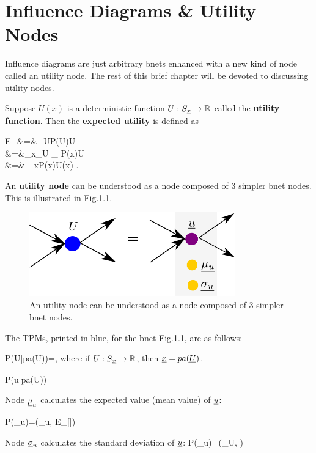\chapter{Influence Diagrams \& Utility Nodes}
\label{ch-inf-dia}

Influence diagrams are
just arbitrary bnets
enhanced with a 
new kind of node called an utility node.
The rest
of this brief chapter  will 
be devoted to discussing utility nodes.

Suppose $U(x)$ is a deterministic 
function $U:S_{\underline{x}}\rightarrow { \mathbb{R}}$
called the {\bf utility function}.
Then the {\bf expected utility}
is defined as


\beqa
E_\rvU[\rvU]&=&\sum_UP(U)U
\\
&=&\sum_x\sum_U
_
{\delta[U, U(x)]}P(x)U
\\
&=&
\sum_xP(x)U(x)
\;.
\eeqa

An {\bf utility node}
can be
understood
as a node
composed of 3 simpler bnet nodes.
This
is illustrated in Fig.\ref{fig-util-node}.

\begin{figure}[h!]
\centering
\includegraphics[width=3.5in]
{inf-dia/util-node.png}
\caption{An utility node
can be
understood
as a node 
composed of 3 simpler bnet nodes.} 
\label{fig-util-node}
\end{figure}

The TPMs,
printed in blue,
for the bnet Fig.\ref{fig-util-node},
are as follows:

\beq\color{blue}
P(U|pa(U))=\delta[U, U(pa(U))]
\;,
\eeq
where if $U:S_{\underline{x}}\rightarrow { \mathbb{R}}$,
then ${\underline{x}}=pa({\underline{U}})$.

\beq\color{blue}
P(u|pa(U))=
\delta[u, U(pa(U))]
\eeq

Node $\underline{\mu}_u$
calculates the
expected value (mean value) of ${\underline{u}}$:

\beq\color{blue}
P(\mu_u)=\delta(\mu_u,
E_{\rvu}[\rvu])
\eeq

Node $\underline{\sigma}_u$
calculates the
standard deviation of ${\underline{u}}$:
\beq\color{blue}
P(\sigma_u)=\delta(\sigma_U,
)
\eeq

